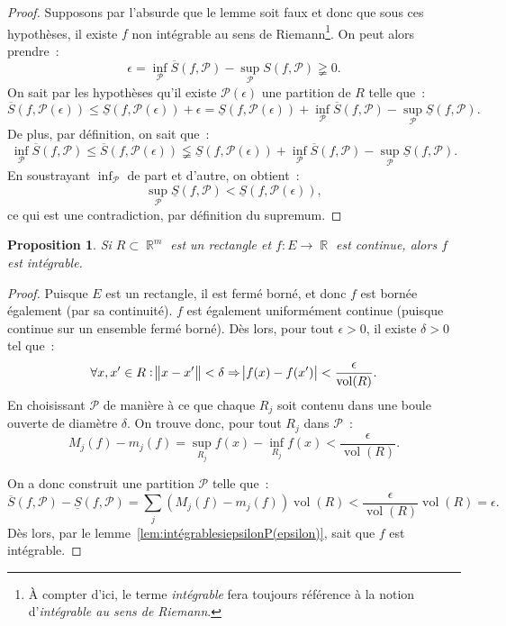 \documentclass{article}
\DeclareMathOperator{\R}{\mathbb R}
\DeclareMathOperator{\vol}{vol}
\newtheorem{prp}[thm]{Proposition}
\theoremstyle{definition}
\theoremstyle{remark}
\begin{document}
		\begin{proof} Supposons par l'absurde que le lemme soit faux et donc que sous ces hypothèses, il existe $f$ non intégrable au sens de Riemann\footnote{
		À compter d'ici, le terme \emph{intégrable} fera toujours référence à la notion d'\emph{intégrable au sens de Riemann}.}. On peut alors prendre~:
		\[\epsilon = \inf_{\mathcal P}\overline S(f, \mathcal P) - \sup_{\mathcal P}S(f, \mathcal P) \gneqq 0.\]
		On sait par les hypothèses qu'il existe $\mathcal P(\epsilon)$ une partition de $R$ telle que~:
		\[\overline S(f, \mathcal P(\epsilon)) \leq \underline S(f, \mathcal P(\epsilon)) + \epsilon
		= \underline S(f, \mathcal P(\epsilon)) + \inf_{\mathcal P}\overline S(f, \mathcal P) - \sup_{\mathcal P}\underline S(f, \mathcal P).\]
		De plus, par définition, on sait que~:
		\[\inf_{\mathcal P}\overline S(f, \mathcal P) \leq \overline S(f, \mathcal P(\epsilon))
		\lneqq \underline S(f, \mathcal P(\epsilon)) + \inf_{\mathcal P}\overline S(f, \mathcal P) - \sup_{\mathcal P}\underline S(f, \mathcal P).\]
		En soustrayant $\inf_{\mathcal P}$ de part et d'autre, on obtient~:
		\[\sup_{\mathcal P}\underline S(f, \mathcal P) < \underline S(f, \mathcal P(\epsilon)),\]
		ce qui est une contradiction, par définition du supremum.
		\end{proof}

		\begin{prp} Si $R \subset \R^m$ est un rectangle et $f : E \to \R$ est continue, alors $f$ est intégrable. \end{prp}
		
		\begin{proof} Puisque $E$ est un rectangle, il est fermé borné, et donc $f$ est bornée également (par sa continuité). $f$ est également uniformément
		continue (puisque continue sur un ensemble fermé borné). Dès lors, pour tout $\epsilon > 0$, il existe $\delta > 0$ tel que~:
		\[\forall x, x' \in R : \norm{x-x'} < \delta \Rightarrow \abs{f(x)-f(x')} < \frac \epsilon{\vol(R)}.\]
		En choisissant $\mathcal P$ de manière à ce que chaque $R_j$ soit contenu dans une boule ouverte de diamètre $\delta$. On trouve donc, pour tout
		$R_j$ dans $\mathcal P$~:
		\[M_j(f) - m_j(f) = \sup_{R_j}f(x) - \inf_{R_j}f(x) < \frac \epsilon{\vol(R)}.\]

		On a donc construit une partition $\mathcal P$ telle que~:
		\[\overline S(f, \mathcal P) - \underline S(f, \mathcal P) = \sum_j\left(M_j(f)-m_j(f)\right)\vol(R) < \frac \epsilon{\vol(R)}\vol(R) = \epsilon.\]
		Dès lors, par le lemme~\ref{lem:intégrablesiepsilonP(epsilon)}, sait que $f$ est intégrable.
		\end{proof}
\end{document}
